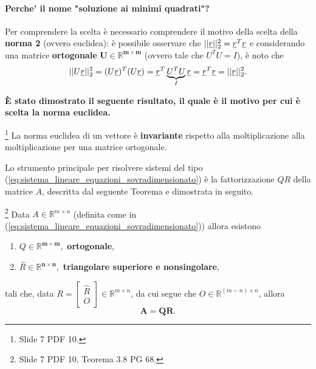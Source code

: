\paragraph{Perche' il nome "soluzione ai minimi quadrati"?} Per comprendere la scelta è necessario comprendere il motivo della scelta della \textbf{norma 2} (ovvero euclidea): è possibile osservare che $||\uline r||_2^2=\uline r^T\uline r$ e considerando una matrice \textbf{ortogonale} $\boldsymbol{U\in\mathbb R^{m\times m}}$ (ovvero tale che $U^TU=I$), è noto che 
\begin{equation*}
    ||U\uline r||_2^2=(U\uline r)^T(U\uline r)=\uline r^T\underbrace{U^TU}_I \uline r = \uline r^T\uline r = ||\uline r||_2^2.
\end{equation*}

\textbf{È stato dimostrato il seguente risultato, il quale è il motivo per cui è scelta la norma euclidea.}

\begin{theorem}\footnote{Slide 7 PDF 10.}
    La norma euclidea di un vettore è \textbf{invariante} rispetto alla moltiplicazione alla moltiplicazione per una matrice ortogonale.
\end{theorem}

Lo strumento principale per risolvere sistemi del tipo (\ref{eq:sistema_lineare_equazioni_sovradimensionato}) è la fattorizzazione $QR$ della matrice $A$, descritta dal seguente Teorema e dimostrata in seguito.


\begin{theorem}\label{th:esistenza_fattorizzazione_QR}\footnote{Slide 7 PDF 10, Teorema 3.8 PG 68.}
    Data $A\in\mathbb R^{m\times n}$ (definita come in (\ref{eq:sistema_lineare_equazioni_sovradimensionato})) allora esistono
    \begin{enumerate}
        \item $Q\in\mathbb R^{\boldsymbol{m\times m}},$ \textbf{ortogonale},
        \item $\widehat R\in\mathbb R^{\boldsymbol{n\times n}},$ \textbf{triangolare superiore e nonsingolare},
    \end{enumerate}
    tali che, data $R =
    \begin{bmatrix}
        \widehat R\\
        O
    \end{bmatrix}\in \mathbb R^{m\times n}$, da cui segue che $O\in\mathbb R^{(m-n)\times n}$, allora
    \begin{equation}\label{eq:fattorizzazione_QR}
        \boldsymbol{A=QR.}
    \end{equation}
\end{theorem}

